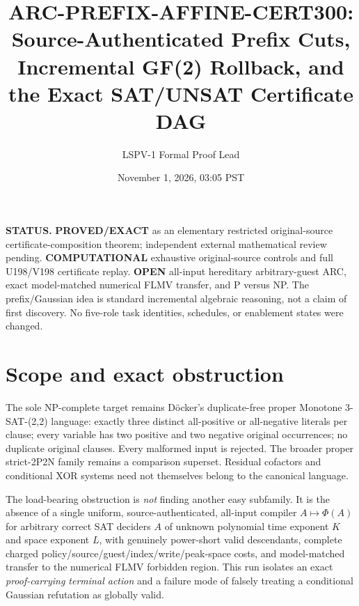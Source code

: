 \documentclass[11pt]{article}
\title{ARC-PREFIX-AFFINE-CERT300: Source-Authenticated Prefix Cuts,\\Incremental GF(2) Rollback, and the Exact SAT/UNSAT Certificate DAG}
\author{LSPV-1 Formal Proof Lead}
\date{November 1, 2026, 03:05 PST}
\begin{document}
\maketitle
\noindent\textbf{STATUS.} \textbf{PROVED/EXACT} as an elementary restricted original-source certificate-composition theorem; independent external mathematical review pending. \textbf{COMPUTATIONAL} exhaustive original-source controls and full U198/V198 certificate replay. \textbf{OPEN} all-input hereditary arbitrary-guest ARC, exact model-matched numerical FLMV transfer, and P versus NP. The prefix/Gaussian idea is standard incremental algebraic reasoning, not a claim of first discovery. No five-role task identities, schedules, or enablement states were changed.

\section{Scope and exact obstruction}
The sole NP-complete target remains D\"ocker's duplicate-free proper Monotone 3-SAT-(2,2) language: exactly three distinct all-positive or all-negative literals per clause; every variable has two positive and two negative original occurrences; no duplicate original clauses. Every malformed input is rejected. The broader proper strict-2P2N family remains a comparison superset. Residual cofactors and conditional XOR systems need not themselves belong to the canonical language.

The load-bearing obstruction is \emph{not} finding another easy subfamily. It is the absence of a single uniform, source-authenticated, all-input compiler $A\mapsto\Phi(A)$ for arbitrary correct SAT deciders $A$ of unknown polynomial time exponent $K$ and space exponent $L$, with genuinely power-short valid descendants, complete charged policy/source/guest/index/write/peak-space costs, and model-matched transfer to the numerical FLMV forbidden region. This run isolates an exact \emph{proof-carrying terminal action} and a failure mode of falsely treating a conditional Gaussian refutation as globally valid.
\end{document}
